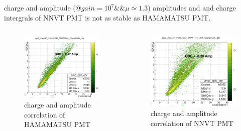 \documentclass[11pt,compress,xcolor=x11names,UTF8]{beamer}
\begin{document}
\begin{frame}{charge and amplitude (@$gain=10^7\&\&\mu\simeq 1.3$)}
amplitudes and  and charge intergrals of NNVT PMT is not as stable as HAMAMATSU PMT.
\begin{columns}
\begin{column}{.5\textwidth}
\begin{figure}
\centering
\includegraphics[width=\textwidth]{figures/hamampqdc.png} %
\caption{charge and amplitude correlation of HAMAMATSU PMT}
\end{figure}
\end{column}
\begin{column}{.5\textwidth}
\begin{figure}
\centering
\includegraphics[width=\textwidth]{figures/mcpampqdc.png} %
\caption{charge and amplitude correlation of NNVT PMT}
\end{figure}
\end{column}
\end{columns}
\end{frame}
\end{document}
